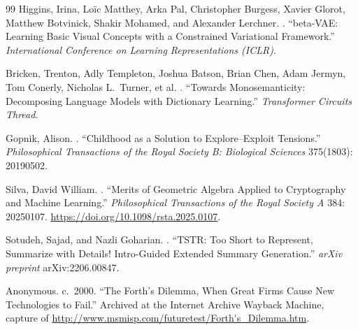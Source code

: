 \documentclass[11pt]{article}
\theoremstyle{plain}
\begin{document}
{\begin{thebibliography}{99}
Higgins, Irina, Lo\"ic Matthey, Arka Pal, Christopher Burgess, Xavier Glorot, Matthew Botvinick, Shakir Mohamed, and Alexander Lerchner.
.
\newblock ``beta-VAE: Learning Basic Visual Concepts with a Constrained Variational Framework.''
\newblock \emph{International Conference on Learning Representations (ICLR)}.

Bricken, Trenton, Adly Templeton, Joshua Batson, Brian Chen, Adam Jermyn, Tom Conerly, Nicholas L.\ Turner, et al.
.
\newblock ``Towards Monosemanticity: Decomposing Language Models with Dictionary Learning.''
\newblock \emph{Transformer Circuits Thread}.

Gopnik, Alison.
.
\newblock ``Childhood as a Solution to Explore--Exploit Tensions.''
\newblock \emph{Philosophical Transactions of the Royal Society B: Biological Sciences} 375(1803): 20190502.

Silva, David William.
.
\newblock ``Merits of Geometric Algebra Applied to Cryptography and Machine Learning.''
\newblock \emph{Philosophical Transactions of the Royal Society A} 384: 20250107.
\newblock \url{https://doi.org/10.1098/rsta.2025.0107}.

Sotudeh, Sajad, and Nazli Goharian.
.
\newblock ``TSTR: Too Short to Represent, Summarize with Details! Intro-Guided Extended Summary Generation.''
\newblock \emph{arXiv preprint} arXiv:2206.00847.

Anonymous.
\newblock c.~2000.
\newblock ``The Forth's Dilemma, When Great Firms Cause New Technologies to Fail.''
\newblock Archived at the Internet Archive Wayback Machine, capture of \url{http://www.msmisp.com/futuretest/Forth's_Dilemma.htm}.

\end{thebibliography}
}
\end{document}
